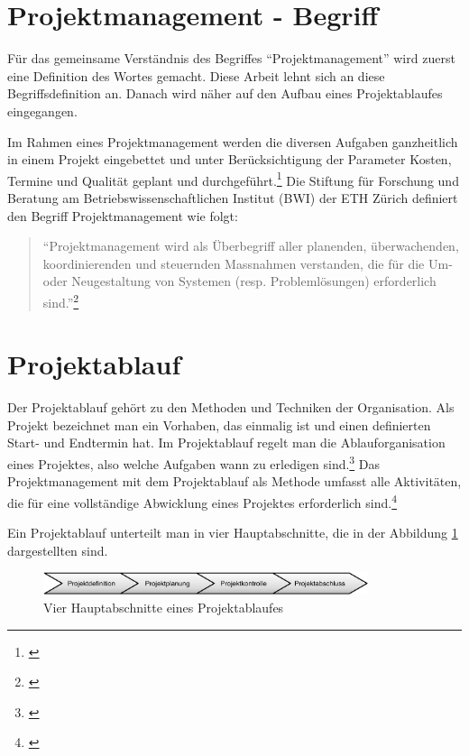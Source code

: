 \section{Projektmanagement - Begriff}
Für das gemeinsame Verständnis des Begriffes ``Projektmanagement'' wird zuerst
eine Definition des Wortes gemacht. Diese Arbeit lehnt sich an diese 
Begriffsdefinition an. Danach wird näher auf den Aufbau eines
Projektablaufes eingegangen.

Im Rahmen eines Projektmanagement werden die diversen Aufgaben ganzheitlich in
einem Projekt eingebettet und unter Berücksichtigung der Parameter Kosten, Termine
und Qualität geplant und durchgeführt.\footnote{\citealp*[Vgl.][S. 9]{burghardt2007einfuehrung}}
Die Stiftung für Forschung und Beratung am Betriebswissenschaftlichen Institut 
(BWI) der ETH Zürich definiert den Begriff Projektmanagement wie folgt:

\begin{quote}
``Projektmanagement wird als Überbegriff aller planenden, überwachenden,
koordinierenden und steuernden Massnahmen verstanden, die für die Um- oder
Neugestaltung von Systemen (resp. Problemlösungen) erforderlich sind.''\footnote{\citealp*[S. 1.1]{stiftung1998projekt}}
\end{quote}

\section{Projektablauf}
Der Projektablauf gehört zu den Methoden und Techniken der Organisation. Als
Projekt bezeichnet man ein Vorhaben, das einmalig ist und einen definierten
Start- und Endtermin hat. Im Projektablauf regelt man die Ablauforganisation
eines Projektes, also welche Aufgaben wann zu erledigen sind.\footnote{\citealp*[Vgl.][S. 136]{schmidt2002einfuehrung}}
Das Projektmanagement mit dem Projektablauf als Methode umfasst alle Aktivitäten,
die für eine vollständige Abwicklung eines Projektes erforderlich sind.\footnote{\citealp*[Vgl.][S. 11]{burghardt2007einfuehrung}}

Ein Projektablauf unterteilt man in vier Hauptabschnitte, die in der Abbildung \ref{pic:01_hauptabschnitte}
dargestellten sind.

\clearpage

\begin{figure}[htbp]
\begin{center}
\includegraphics[width=0.85\textwidth,angle=0]{./bilder/theorie/01_hauptabschnitte.pdf}
\caption[Vier Hauptabschnitte eines Projektablaufes]{Vier Hauptabschnitte eines Projektablaufes\footnotemark}
\label{pic:01_hauptabschnitte}
\end{center}
\end{figure}

